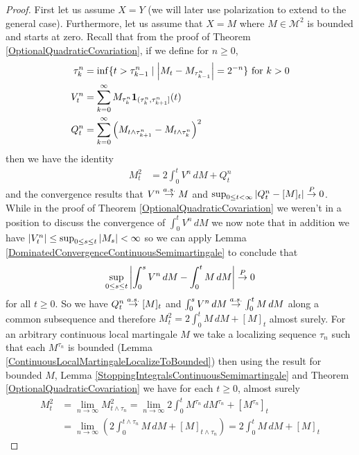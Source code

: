 \begin{proof}
First let us assume $X =Y$ (we will later use polarization to extend to the general case).  Furthermore, let us assume that $X = M$ where $M \in \mathcal{M}^2$ is bounded and starts at zero.  Recall that from the proof of Theorem \ref{OptionalQuadraticCovariation}, if we define for $n \geq 0$,
\begin{align*} 
\tau^n_k &= \inf \lbrace t > \tau^n_{k-1} \mid \left \vert M_t - M_{\tau^n_{k-1}} \right \vert = 2^{-n} \rbrace \text{ for $k > 0$} \\
V^n_t &= \sum_{k=0}^\infty M_{\tau^n_{k}} \textbf{1}_{(\tau^n_{k}, \tau^n_{k+1}]}(t) \\ 
Q^n_t &= \sum_{k=0}^\infty \left (M_{t \wedge \tau^n_{k+1}}  - M_{t \wedge \tau^n_k}\right)^2 
\end{align*}
then we have the identity
\begin{align*}
M^2_t &= 2 \int_0^t V^n \, dM + Q^n_t
\end{align*}
and the convergence results that $V^n \overset{a.s.}\to M$ and $\sup_{0 \leq t < \infty} \left \vert Q^n_t - [M]_t \right \vert \overset{P}\to 0$.  While in the proof of Theorem \ref{OptionalQuadraticCovariation} we weren't in a position to discuss the convergence of $\int_0^t V^n \, dM$ we now note that in addition we have $\left \vert V^n_t \right \vert \leq \sup_{0 \leq s \leq t} \left \vert M_s \right \vert < \infty$ so we can apply Lemma \ref{DominatedConvergenceContinuousSemimartingale} to conclude that 
\begin{align*}
\sup_{0 \leq s \leq t} \left \vert \int_0^s V^n \, dM - \int_0^t M \, dM \right \vert \overset{P}\to 0
\end{align*}
for all $t \geq 0$.  So we have $Q^n_t \overset{a.s.}\to [M]_t$ and $\int_0^s V^n \, dM  \overset{a.s.}\to \int_0^t M \, dM$ along a common subsequence and therefore $M^2_t = 2 \int_0^t M \, dM + [M]_t$ almost surely.  For an arbitrary continuous local martingale $M$ we take a localizing sequence $\tau_n$ such that each $M^{\tau_n}$ is bounded (Lemma \ref{ContinuousLocalMartingaleLocalizeToBounded}) then using the result for bounded $M$, Lemma \ref{StoppingIntegralsContinuousSemimartingale} and Theorem \ref{OptionalQuadraticCovariation} we have for each $t \geq 0$, almost surely
\begin{align*}
M_t^2 &= \lim_{n \to \infty} M^2_{t \wedge \tau_n} = \lim_{n \to \infty} 2 \int_0^{t} M^{\tau_n} \, dM^{\tau_n} + [M^{\tau_n}]_t \\
&=\lim_{n \to \infty} \left( 2 \int_0^{t \wedge \tau_n} M \, dM + [M]_{t \wedge \tau_n} \right) = 2 \int_0^{t} M \, dM + [M]_{t} 
\end{align*}


\end{proof}
